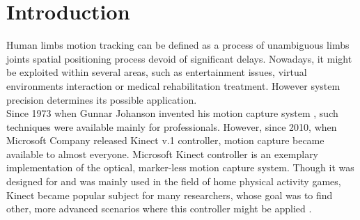 \documentclass[sensors,article,submit,moreauthors,pdftex,10pt,a4paper]{mdpi}
\begin{document}


\section{Introduction}

Human limbs motion tracking can be defined as a process of unambiguous limbs joints spatial positioning process devoid of significant delays. Nowadays, it might be exploited within several areas, such as entertainment issues, virtual environments interaction or medical rehabilitation treatment. However system precision determines its possible application. \\
Since 1973 when Gunnar Johanson invented his motion capture system \cite{Johansson1973}, such techniques were available mainly for professionals. However, since 2010, when Microsoft Company released Kinect v.1 controller, motion capture became available to almost everyone. Microsoft Kinect controller is an exemplary implementation of the optical, marker-less motion capture system. Though it was designed for and was mainly used in the field of home physical activity games, Kinect became popular subject for many researchers, whose goal was to find other, more advanced scenarios where this controller might be applied \cite{Lange2012, Chang2011}.
\end{document}

